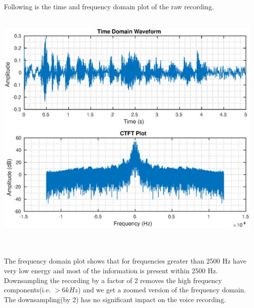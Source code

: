 \documentclass[11pt]{article}
\begin{document}
Following is the time and frequency domain plot of the raw recording.\\
\vspace{10pt}\\ 
\centerline{\includegraphics[scale = 1]{./Task2_original.eps}}\\
\vspace{10pt}\\ 

The frequency domain plot shows that for frequencies greater than 2500 Hz have very low energy and most of the information is present within 2500 Hz.\\

Downsampling the recording by a factor of 2 removes the high frequency components(i.e. $>6kHz$) and we get a zoomed version of the frequency domain.\\
The downsampling(by 2) has no significant impact on the voice recording.\\
\end{document}
